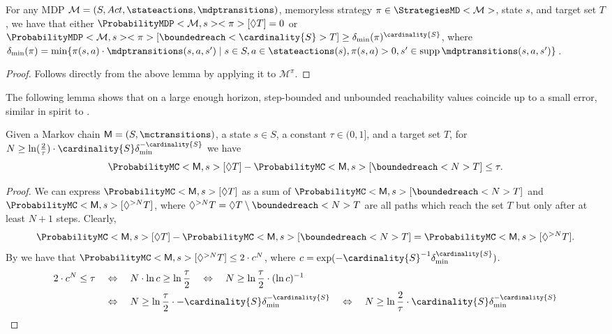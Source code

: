 \documentclass{article}
\newcommand{\MC}{\mathsf{M}}
\newcommand{\MDP}{\mathcal{M}}
\newcommand{\States}{S}
\newcommand{\Actions}{Act}
\newcommand{\strategy}{\pi}
\DeclareMathOperator{\support}{supp}
\newcommand{\reach}{\Diamond}
\newcommand{\targetset}{T}
\begin{document}
\begin{corollary} \label{stm:mdp_minimum_reachability}
	For any MDP $\MDP = (\States,  \Actions, \stateactions, \mdptransitions)$, memoryless strategy $\strategy \in \StrategiesMD<\MDP>$, state $s$, and target set $\targetset$, we have that either $\ProbabilityMDP<\MDP, s><\strategy>[\reach \targetset] = 0$ or $\ProbabilityMDP<\MDP, s><\strategy>[\boundedreach<\cardinality{\States}> \targetset] \geq \delta_{\min}(\strategy)^{\cardinality{\States}}$, where $\delta_{\min}(\strategy) = \min \{ \strategy(s, a) \cdot \mdptransitions(s, a, s') \mid s \in \States, a \in \stateactions(s), \strategy(s, a) > 0, s' \in \support \mdptransitions(s, a, s') \}$.
\end{corollary}
\begin{proof}
	Follows directly from the above lemma by applying it to $\MDP^\strategy$. 
\end{proof}
The following lemma shows that on a large enough horizon, step-bounded and unbounded reachability values coincide up to a small error, similar in spirit to \cite[Lemma~2]{DBLP:journals/ml/KearnsS02}.
\begin{lemma} \label{stm:markov_chain_finite_reach_bound}
	Given a Markov chain $\MC = (\States, \mctransitions)$, a state $s \in \States$, a constant $\tau \in (0, 1]$, and a target set $\targetset$, for $N \geq \ln(\frac{2}{\tau}) \cdot \cardinality{\States} \delta_{\min}^{-\cardinality{\States}}$ we have
	\begin{equation*}
		\ProbabilityMC<\MC, s>[\reach \targetset] - \ProbabilityMC<\MC, s>[\boundedreach<N> \targetset] \leq \tau.
	\end{equation*}
\end{lemma}

\begin{proof}
	We can express $\ProbabilityMC<\MC, s>[\reach \targetset]$ as a sum of $\ProbabilityMC<\MC, s>[\boundedreach<N> \targetset]$ and $\ProbabilityMC<\MC, s>[\reach^{> N} \targetset]$, where $\reach^{> N} \targetset = \reach \targetset \setminus \boundedreach<N> \targetset$ are all paths which reach the set $\targetset$ but only after at least $N + 1$ steps.
	Clearly,
	\begin{equation*}
		\ProbabilityMC<\MC, s>[\reach \targetset] - \ProbabilityMC<\MC, s>[\boundedreach<N> \targetset] = \ProbabilityMC<\MC, s>[\reach^{> N} \targetset].
	\end{equation*}
	By \cite[Lemma~5.1]{DBLP:journals/jacm/BrazdilKK14} we have that $\ProbabilityMC<\MC, s>[\reach^{> N} \targetset] \leq 2 \cdot c^N$, where $c = \exp(-\cardinality{\States}^{-1} \delta_{\min}^{\cardinality{\States}})$.
	\begin{align*}
		2 \cdot c^N \leq \tau \quad & \Leftrightarrow \quad N \cdot \ln c \geq \ln \frac{\tau}{2} \quad \Leftrightarrow \quad N \geq \ln \frac{\tau}{2} \cdot (\ln c)^{-1} \\
			& \Leftrightarrow \quad N \geq \ln \frac{\tau}{2} \cdot - \cardinality{\States} \delta_{\min}^{-\cardinality{\States}} \quad \Leftrightarrow \quad N \geq \ln \frac{2}{\tau} \cdot  \cardinality{\States} \delta_{\min}^{-\cardinality{\States}} \qedhere
	\end{align*}
\end{proof}
\end{document}
